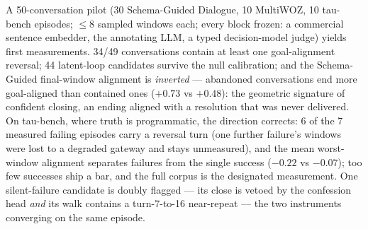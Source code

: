 A 50-conversation pilot (30 Schema-Guided Dialogue, 10 MultiWOZ, 10 tau-bench episodes;
$\le 8$ sampled windows each; every block frozen: a commercial sentence embedder, the
annotating LLM, a typed decision-model judge) yields first measurements.
34/49 conversations contain at least one goal-alignment reversal; 44 latent-loop candidates
survive the null calibration; and the Schema-Guided final-window alignment is
\emph{inverted} --- abandoned conversations end more goal-aligned than contained ones
($+0.73$ vs $+0.48$): the geometric signature of confident closing, an ending aligned with a
resolution that was never delivered.
On tau-bench, where truth is programmatic, the direction corrects: 6 of the 7 measured
failing episodes carry a reversal turn (one further failure's windows were lost to a
degraded gateway and stays unmeasured), and the mean worst-window alignment separates
failures from the single success ($-0.22$ vs $-0.07$); too few successes ship a bar, and
the full corpus is the designated measurement.
One silent-failure candidate is doubly flagged --- its close is vetoed by the confession
head \emph{and} its walk contains a turn-7-to-16 near-repeat --- the two instruments
converging on the same episode.
